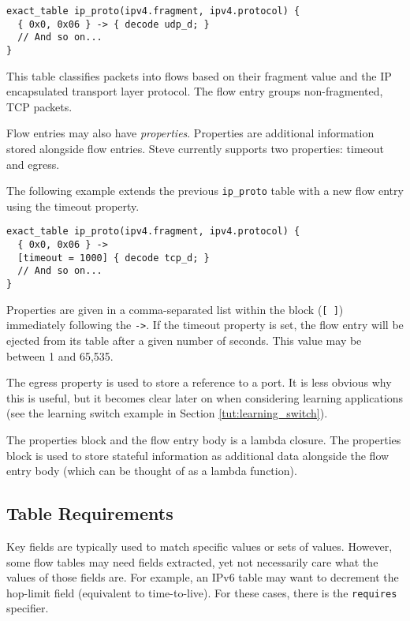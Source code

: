 \begin{codepage}
\begin{lstlisting}
exact_table ip_proto(ipv4.fragment, ipv4.protocol) {
  { 0x0, 0x06 } -> { decode udp_d; }
  // And so on...
}
\end{lstlisting}
\end{codepage}

This table classifies packets into flows based on their fragment value
and the IP encapsulated transport layer protocol. The flow entry
groups non-fragmented, TCP packets.

Flow entries may also have \textit{properties}. Properties are additional
information stored alongside flow entries. 
Steve currently supports two properties: timeout and egress.

The following example extends the previous \texttt{ip\_proto} table with a new flow entry using the timeout property.

\begin{codepage}
\begin{lstlisting}
exact_table ip_proto(ipv4.fragment, ipv4.protocol) {
  { 0x0, 0x06 } ->
  [timeout = 1000] { decode tcp_d; }
  // And so on...
}
\end{lstlisting}
\end{codepage}

Properties are given in a comma-separated list within the block (\texttt{[ ]}) 
immediately following the \texttt{->}. 
If the timeout property is set, the flow entry will be ejected from its table
after a given number of seconds. This value may be between 1 and 65,535.

The egress property is used to store a reference to a port.
It is less obvious why this is useful, but it becomes clear later on when
considering learning applications (see the learning switch example in Section
\ref{tut:learning_switch}).

The properties block and the flow entry body is a lambda closure. 
The properties block is used to
store stateful information as additional data alongside the flow entry
body (which can be thought of as a lambda function).

\subsection{Table Requirements} \label{tut:table_req}

Key fields are typically used to match specific values or sets of values. However, some flow tables may need fields extracted, yet not
necessarily care what the values of those fields are. 
For example, an IPv6 table
may want to decrement the hop-limit field (equivalent to time-to-live).
For these cases, there is the \texttt{requires} specifier.

